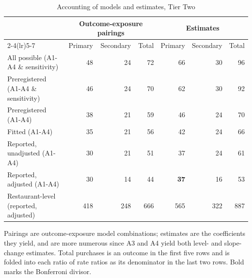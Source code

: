 \begin{table}[H]
\centering
\caption{Accounting of models and estimates, Tier Two}
\label{tab:estimate_accounting_t2}
\begin{tabular}{lrrrrrr}
\toprule
 & \multicolumn{3}{c}{Outcome-exposure pairings} & \multicolumn{3}{c}{Estimates} \\
\cmidrule(lr){2-4}\cmidrule(lr){5-7}
 & Primary & Secondary & Total & Primary & Secondary & Total \\
\midrule
All possible (A1-A4 \& sensitivity) & 48 & 24 & 72 & 66 & 30 & 96 \\
Preregistered (A1-A4 \& sensitivity) & 46 & 24 & 70 & 62 & 30 & 92 \\
Preregistered (A1-A4) & 38 & 21 & 59 & 46 & 24 & 70 \\
Fitted (A1-A4) & 35 & 21 & 56 & 42 & 24 & 66 \\
Reported, unadjusted (A1-A4) & 30 & 21 & 51 & 37 & 24 & 61 \\
Reported, adjusted (A1-A4) & 30 & 14 & 44 & \textbf{37} & 16 & 53 \\
Restaurant-level (reported, adjusted) & 418 & 248 & 666 & 565 & 322 & 887 \\
\bottomrule
\end{tabular}
\par\smallskip\footnotesize Pairings are outcome-exposure model combinations; estimates are the coefficients they yield, and are more numerous since A3 and A4 yield both level- and slope-change estimates. Total purchases is an outcome in the first five rows and is folded into each ratio of rate ratios as its denominator in the last two rows. Bold marks the Bonferroni divisor.
\end{table}
